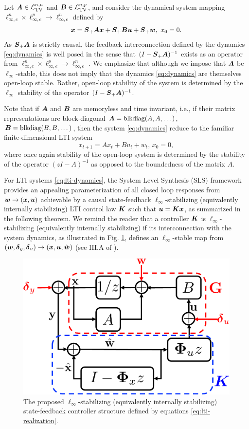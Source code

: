Let $\boldsymbol{A} \in \mathcal{L}_{\mathrm{TV}}^{n,n}$ and $\boldsymbol{B} \in \mathcal{L}_{\mathrm{TV}}^{n,p}$, and consider the dynamical system mapping $\ell^n_{\infty,e} \times \ell^p_{\infty,e} \to \ell^n_{\infty,e}$ defined by
\begin{equation}
\boldsymbol{x} = \boldsymbol{S}_+\boldsymbol{A}\boldsymbol{x} + \boldsymbol{S}_+ \boldsymbol{B} \boldsymbol{u} + \boldsymbol{S}_+ \boldsymbol{w}, \ x_0 = 0.
\label{eq:dynamics}
\end{equation}
As $\boldsymbol{S}_+\boldsymbol{A}$ is strictly causal, the feedback interconnection defined by the dynamics \eqref{eq:dynamics} is well posed in the sense that $(I-\boldsymbol{S}_+\boldsymbol{A})^{-1}$ exists as an operator from $\ell^n_{\infty,e} \times \ell^p_{\infty,e} \to \ell^n_{\infty,e}$ \cite{dahleh1994control}.  We emphasize that although we impose that $\boldsymbol{A}$ be $\ell_\infty$-stable, this does not imply that the dynamics \eqref{eq:dynamics} are themselves open-loop stable.  Rather, open-loop stability of the system is determined by the $\ell_\infty$ stability of the operator $(I-\boldsymbol{S}_+\boldsymbol{A})^{-1}$.

Note that if $\boldsymbol{A}$ and $\boldsymbol{B}$ are memoryless and time invariant, i.e., if their matrix representations are block-diagonal $\boldsymbol{A} = \mathrm{blkdiag}(A,A,\dots)$, $\boldsymbol{B} = \mathrm{blkdiag}(B,B,\dots)$, then the system \eqref{eq:dynamics} reduce to the familiar finite-dimensional LTI system
\begin{equation}
x_{t+1} = A x_t + Bu_t + w_t, \, x_0 = 0,
\label{eq:lti-dynamics}
\end{equation}
where once again stability of the open-loop system is determined by the stability of the operator $(zI-A)^{-1}$ as opposed to the boundedness of the matrix $A$.

For LTI systems \eqref{eq:lti-dynamics}, the System Level Synthesis (SLS) framework \cite{wang2019system,anderson2019system} provides an appealing parameterization of all closed loop responses from $\boldsymbol{w} \to (\boldsymbol{x}, \boldsymbol{u})$ achievable by a causal state-feedback $\ell_\infty$-stabilizing (equivalently internally stabilizing) LTI control law $\boldsymbol{K}$ such that $\boldsymbol{u} = \boldsymbol{K} \boldsymbol{x}$, as summarized in the following theorem.  We remind the reader that a controller $\boldsymbol{K}$ is $\ell_\infty$-stabilizing (equivalently internally stabilizing) if its interconnection with the system dynamics, as illustrated in Fig. \ref{fig:lti-interconnect}, defines an $\ell_\infty$-stable map from $(\boldsymbol{w}, \boldsymbol{\delta}_y, \boldsymbol{\delta}_u) \to (\boldsymbol{x}, \boldsymbol{u}, \hat{\boldsymbol{w}})$ (see III.A of \cite{wang2019system} ).

\begin{figure}
\centering
\includegraphics[width=.4\textwidth]{lti-interconnect}
\caption{The proposed $\ell_\infty$-stabilizing (equivalently internally stabilizing) state-feedback controller structure defined by equations \eqref{eq:lti-realization}.}
\label{fig:lti-interconnect}
\end{figure}

